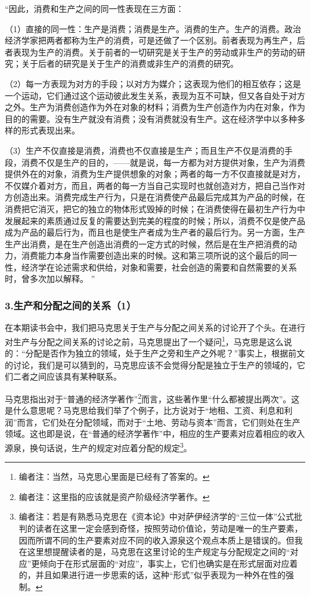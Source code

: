 \documentclass[a4paper,twoside,12pt,AutoFakeBold]{ctexart}
\begin{document}
\begin{adjustwidth}{2em}{2em}
    \qquad\fangsong
“因此，消费和生产之间的同一性表现在三方面：

（1）直接的同一性：生产是消费；消费是生产。消费的生产。生产的消费。政治经济学家把两者都称为生产的消费，可是还做了一个区别。前者表现为再生产，后者表现为生产的消费。关于前者的一切研究是关于生产的劳动或非生产的劳动的研究；关于后者的研究是关于生产的消费或非生产的消费的研究。

（2）每一方表现为对方的手段；以对方为媒介；这表现为他们的相互依存；这是一个运动，它们通过这个运动彼此发生关系，表现为互不可缺，但又各自处于对方之外。生产为消费创造作为外在对象的材料；消费为生产创造作为内在对象，作为目的的需要。没有生产就没有消费；没有消费就没有生产。这在经济学中以多种多样的形式表现出来。

（3）生产不仅直接是消费，消费也不仅直接是生产；而且生产不仅是消费的手段，消费不仅是生产的目的，——就是说，每一方都为对方提供对象，生产为消费提供外在的对象，消费为生产提供想象的对象；两者的每一方不仅直接就是对方，不仅媒介着对方，而且，两者的每一方当自己实现时也就创造对方，把自己当作对方创造出来。消费完成生产行为，只是在消费使产品最后完成其为产品的时候，在消费把它消灭，把它的独立的物体形式毁掉的时候；在消费使得在最初生产行为中发展起来的素质通过反复的需要达到完美的程度的时候；所以，消费不仅是使产品成为产品的最后行为，而且也是使生产者成为生产者的最后行为。另一方面，生产生产出消费，是在生产创造出消费的一定方式的时候，然后是在生产把消费的动力，消费能力本身当作需要创造出来的时候。这和第三项所说的这个最后的同一性，经济学在论述需求和供给，对象和需要，社会创造的需要和自然需要的关系时，曾多次加以解释。
” 
\end{adjustwidth}

\subsubsection{3.生产和分配之间的关系（1）}
在本期读书会中，我们把马克思关于生产与分配之间关系的讨论开了个头。在进行对生产与分配之间关系的讨论之前，马克思提出了一个疑问\footnote{编者注：当然，马克思心里面是已经有了答案的。}，马克思是这么说的：“分配是否作为独立的领域，处于生产之旁和生产之外呢？”事实上，根据前文的讨论，我们是可以猜到的，马克思应该不会觉得分配是独立于生产的领域的，它们二者之间应该具有某种联系。

马克思指出对于“普通的经济学著作”\footnote{编者注：这里指的应该就是资产阶级经济学著作。}而言，这些著作里“什么都被提出两次”。这是什么意思呢？马克思给我们举了个例子，比方说对于“地租、工资、利息和利润”而言，它们处在分配领域，而对于“土地、劳动与资本”而言，它们则处在生产领域。这也即是说，在“普通的经济学著作”中，相应的生产要素对应着相应的收入源泉，换句话说，生产的规定对应着分配的规定\footnote{编者注：若是有熟悉马克思在《资本论》中对萨伊经济学的“三位一体”公式批判的读者在这里一定会感到奇怪，按照劳动价值论，劳动是唯一的生产要素，因而所谓不同的生产要素对应不同的收入源泉这个观点本质上是错误的。但我在这里想提醒读者的是，马克思在这里讨论的生产规定与分配规定之间的“对应”更倾向于在形式层面的“对应”，事实上，它们也确实是在形式层面对应着的，并且如果进行进一步思索的话，这种“形式”似乎表现为一种外在性的强制。}。
\end{document}
